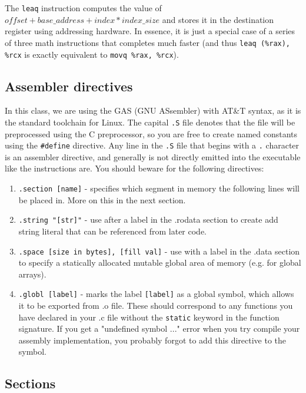 \documentclass[11pt]{article}
\begin{document}
The \texttt{leaq} instruction computes the value of $offset + base\_address + index *
index\_size$ and stores it in the destination register using addressing hardware. In
essence, it is just a special case of a series of three math instructions that completes
much faster (and thus \texttt{leaq (\%rax), \%rcx} is exactly equivalent to \texttt{movq
\%rax, \%rcx}).

\subsection{Assembler directives}

In this class, we are using the GAS (GNU ASsembler) with AT\&T syntax, as it is the
standard toolchain for Linux. The capital \texttt{.S} file denotes that the file will be
preprocessed using the C preprocessor, so you are free to create named constants using the
\texttt{\#define} directive. Any line in the \texttt{.S} file that begins with a \texttt{.}
character is an assembler directive, and generally is not directly emitted into the
executable like the instructions are. You should beware for the following directives:

\begin{enumerate}
    \item \texttt{.section [name]} - specifies which segment in memory the following lines
        will be placed in. More on this in the next section.
    \item \texttt{.string "[str]"} - use after a label in the .rodata section to create add
        string literal that can be referenced from later code.
    \item \texttt{.space [size in bytes], [fill val]} - use with a label in the .data
        section to specify a statically allocated mutable global area of memory (e.g. for
        global arrays).
    \item \texttt{.globl [label]} - marks the label \texttt{[label]} as a global symbol,
        which allows it to be exported from .o file. These should correspond to any
        functions you have declared in your .c file without the \texttt{static} keyword in
        the function signature. If you get a "undefined symbol ..." error when you try
        compile your assembly implementation, you probably forgot to add this directive to
        the symbol.
\end{enumerate}

\subsection{Sections}
\end{document}

